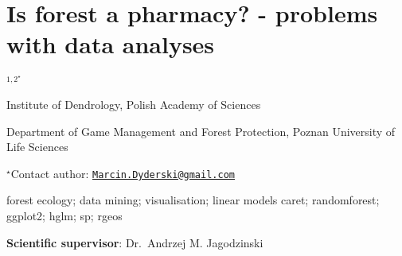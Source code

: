 \documentclass[\main/boa.tex]{subfiles}
\begin{document}
\section{Is forest a pharmacy? - problems with data analyses}

\begin{center}
  {\bf {}$^{1, 2^\star}$}
\end{center}

\vskip 0.3cm

\begin{affiliations}
\begin{enumerate}
\begin{minipage}{0.915\textwidth}
\centering
\item Institute of Dendrology, Polish Academy of Sciences \\[-2pt]
\item Department of Game Management and Forest Protection, Poznan University
of Life Sciences \\[-2pt]
\end{minipage}
\end{enumerate}
$^\star$Contact author: \href{mailto:Marcin.Dyderski@gmail.com}{\nolinkurl{Marcin.Dyderski@gmail.com}}\\
\end{affiliations}

\vskip 0.5cm

\begin{minipage}{0.915\textwidth}
\keywords forest ecology; data mining; visualisation; linear models
\packages caret; randomforest; ggplot2; hglm; sp; rgeos
\end{minipage}

\vskip 0.8cm

\textbf{Scientific supervisor}: Dr.~Andrzej M. Jagodzinski
\end{document}
